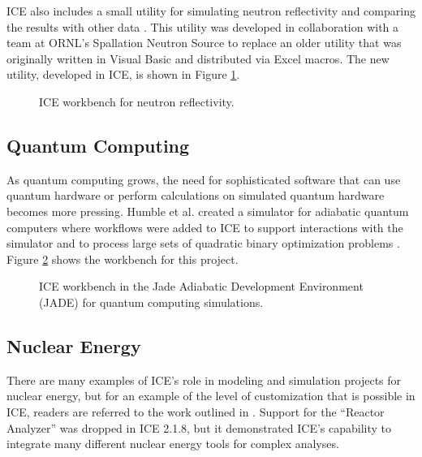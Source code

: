 ICE also includes a small utility for simulating neutron reflectivity and
comparing the results with other data \cite{billings_brand_2015}. This 
utility was developed in collaboration with a team at ORNL's Spallation Neutron 
Source to replace an older utility that was originally written in Visual Basic and distributed via Excel macros. The new utility, developed in ICE, is shown in Figure \ref{reflectivity}.

\begin{figure}[H]
\centering
{}
\caption{ICE workbench for neutron reflectivity.}
\label{reflectivity}
\end{figure}

\subsection{Quantum Computing}\label{quantum-computing}

As quantum computing grows, the need for sophisticated
software that can use quantum hardware or perform calculations on
simulated quantum hardware becomes more pressing. Humble et al. created a simulator for
adiabatic quantum computers where workflows were added to ICE to support
interactions with the simulator and to process large sets of
quadratic binary optimization problems \cite{humble_integrated_2014}. Figure \ref{jade} shows the workbench for this project.

\begin{figure}[H]
\centering
{}
\caption{ICE workbench in the Jade Adiabatic Development Environment (JADE) for quantum computing simulations.}
\label{jade}
\end{figure}


\subsection{Nuclear Energy}\label{nuclear-energy}

There are many examples of ICE's role in modeling and simulation
projects for nuclear energy, but for an example of the level of
customization that is possible in ICE, readers are referred to the work outlined in
\cite{billings_domain-specific_2015}. Support for the ``Reactor
Analyzer'' was dropped in ICE 2.1.8, but it demonstrated ICE's capability
to integrate many different nuclear energy tools for complex analyses.

